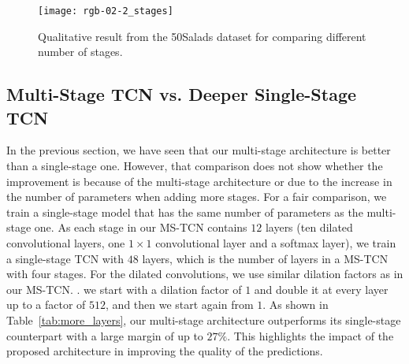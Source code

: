 \documentclass[10pt,twocolumn,letterpaper]{article}
\begin{document}
\begin{table}[tb]
\centering
{}
\caption{Effect of the number of stages on the 50Salads dataset.}
\label{tab:number_of_stages}
\end{table}

\begin{figure}[tb]
\begin{center}
   \texttt{[image: rgb-02-2\_stages]}
\end{center}
   \caption{Qualitative result from the 50Salads dataset for comparing different number of stages.}
\label{fig:qualitative_results_stages}
\end{figure}


\subsection{Multi-Stage TCN vs. Deeper Single-Stage TCN}

In the previous section, we have seen that our multi-stage architecture is 
better than a single-stage one. However, that comparison does not show whether 
the improvement is because of the multi-stage architecture or due to the increase 
in the number of parameters when adding more stages. For a fair comparison, we 
train a single-stage model that has the same number of parameters as the multi-stage one. 
As each stage in our MS-TCN contains $12$ layers (ten dilated convolutional layers, one 
$1 \times 1$ convolutional layer and a softmax layer), we train a single-stage TCN with 
$48$ layers, which is the number of layers in a MS-TCN with four stages. For the dilated convolutions, 
we use similar dilation factors as in our MS-TCN. \Ie. we start with a dilation factor 
of $1$ and double it at every layer up to a factor of $512$, and then we start again from 
$1$. As shown in Table~\ref{tab:more_layers}, our multi-stage architecture outperforms 
its single-stage counterpart with a large margin of up to $27\%$. This highlights the 
impact of the proposed architecture in improving the quality of the predictions.
\end{document}
